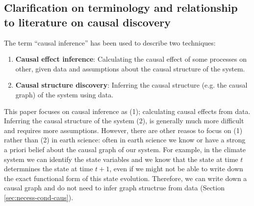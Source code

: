 \documentclass[12pt]{article}
\begin{document}
\subsection{Clarification on terminology and relationship to literature on causal discovery}
\label{sec:discovery}
The term ``causal inference'' has been used to describe two
techniques:

\begin{enumerate}
\item \textbf{Causal effect inference}: Calculating the causal effect
  of some processes on other, given data and assumptions about the
  causal structure of the system.
\item \textbf{Causal structure discovery}: Inferring the causal
  structure (e.g. the causal graph) of the system using data.
\end{enumerate}

This paper focuses on causal inference as (1); calculating causal
effects from data. Inferring the causal structure of the system (2),
is generally much more difficult and requires more
assumptions. However, there are other reasos to focus on (1) rather
than (2) in earth science: often in earth science we know or have a
strong a priori belief about the causal graph of our system. For
example, in the climate system we can identify the state variables and
we know that the state at time \(t\) determnines the state at time
\(t+1\), even if we might not be able to write down the exact
functional form of this state evolution. Therefore, we can write down
a causal graph and do not need to infer graph structrue from data
(Section \ref{sec:necess-cond-caus}).
\end{document}
